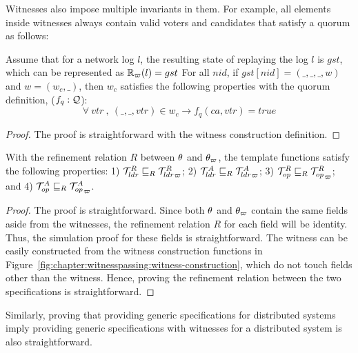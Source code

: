 Witnesses also impose multiple invariants in them.
For example, all elements inside witnesses 
always contain valid voters and candidates that satisfy a quorum as follows:


\begin{theorem}\label{thm:witness-invariant}
Assume that for a network log $l$, the resulting state of replaying the log $l$ 
	is $gst$, which can be represented as $\mathbb{R}_\varpi(l) = gst$
For all $nid$, if $gst[nid] = (\_, \_, \_, w)$ and $w = (w_c, \_)$, then $w_c$ satisfies the following properties with the quorum definition, ($f_q : \mathcal{Q}$):
$$\forall\ vtr\ , \ ( \_, \_, vtr) \in w_c \rightarrow f_q(ca, vtr) = true$$
\end{theorem}

\begin{proof}
The proof is straightforward with the witness construction definition.
\end{proof}

\begin{theorem}\label{theorem:chapter:witnesspassing:spec-refine}
With the refinement relation $R$ between $\theta$ and $\theta_\varpi$, 
the template functions satisfy the following properties:
1) $\mathcal{T}^{R}_{ldr}  \sqsubseteq_{R} {\mathcal{T}^{R}_{ldr}}_{\varpi} $; 
2) $\mathcal{T}^{A}_{ldr}  \sqsubseteq_{R} {\mathcal{T}^{A}_{ldr}}_{\varpi} $; 
3) $\mathcal{T}^{R}_{op}  \sqsubseteq_{R} {\mathcal{T}^{R}_{op}}_{\varpi} $; and
4) $\mathcal{T}^{A}_{op}  \sqsubseteq_{R} {\mathcal{T}^{A}_{op}}_{\varpi}$.
\end{theorem}

\begin{proof}
The proof is straightforward. 
Since both $\theta$ and $\theta_\varpi$ contain the same fields aside from
the witnesses, the refinement relation $R$ for each field will be identity.
Thus, the simulation proof for these fields is straightforward. 
The witness can be easily constructed from the witness construction functions
in Figure~\ref{fig:chapter:witnesspassing:witness-construction}, which do not touch fields other
than the witness. 
Hence, proving the refinement relation between the two specifications is
straightforward.
\end{proof}

Similarly, proving that providing generic specifications for distributed
systems imply providing generic specifications with witnesses for a distributed system is also straightforward.


